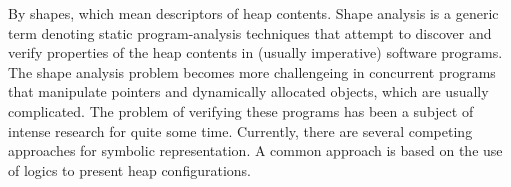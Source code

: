  



By shapes, which mean descriptors of heap contents. Shape analysis is a generic term denoting static
program-analysis techniques that attempt to discover and verify properties of the heap contents in (usually imperative) software programs. The shape analysis problem becomes more challengeing in concurrent programs that manipulate pointers and dynamically allocated objects, which are usually complicated. 
 The problem of verifying these programs has been a subject of intense research for quite some time. Currently, there are several competing approaches for symbolic representation. A common approach is %
 based on the use of logics to present heap configurations. 
 
